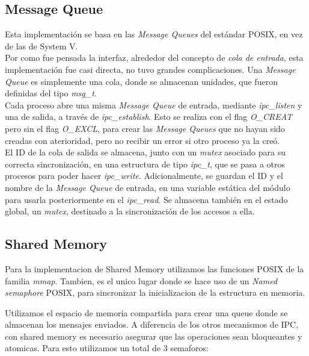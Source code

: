 \documentclass[a4paper,10pt]{article}
\begin{document}
\subsection{Message Queue}

Esta implementación se basa en las \textit{Message Queues} del estándar POSIX, en vez de las de System V.\\

Por como fue pensada la interfaz, alrededor del concepto de \textit{cola de entrada}, esta implementación fue casi directa, no tuvo grandes complicaciones.
Una \textit{Message Queue} es simplemente una cola, donde se almacenan unidades, que fueron definidas del tipo \textit{msg\_t}.\\

Cada proceso abre una misma \textit{Message Queue} de entrada, mediante \textit{ipc\_listen} y una de salida, a través de \textit{ipc\_establish}. Esto se realiza 
con el flag \textit{O\_CREAT} pero sin el flag \textit{O\_EXCL}, para crear las \textit{Message Queues} que no hayan sido creadas con aterioridad, pero no recibir 
un error si otro proceso ya la creó.\\

El ID de la cola de salida se almacena, junto con un \textit{mutex} asociado para su correcta sincronización, en una estructura de tipo \textit{ipc\_t}, que se 
pasa a otros procesos para poder hacer \textit{ipc\_write}. Adicionalmente, se guardan el ID y el nombre de la \textit{Message Queue} de entrada, en una 
variable estática del módulo para usarla posteriormente en el \textit{ipc\_read}. Se almacena también en el estado global, un \textit{mutex}, destinado a la 
sincronización de los accesos a ella.\\

\subsection{Shared Memory}
Para la implementacion de Shared Memory utilizamos las funciones POSIX de la familia \textit{mmap}.
Tambien, es el unico lugar donde se hace uso de un \textit{Named semaphore} POSIX, para sincronizar la inicializacion de la estructura en memoria.

Utilizamos el espacio de memoria compartida para crear una queue donde se almacenan los mensajes enviados.
A diferencia de los otros mecanismos de IPC, con shared memory es necesario asegurar que las operaciones sean bloqueantes y atomicas.
Para esto utilizamos un total de 3 semaforos:
\end{document}
